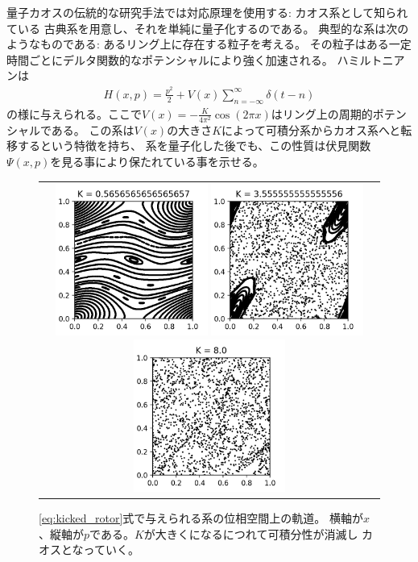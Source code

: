 量子カオスの伝統的な研究手法では対応原理を使用する: カオス系として知られている
古典系を用意し、それを単純に量子化するのである。
典型的な系は次のようなものである\cite{ullmo}: あるリング上に存在する粒子を考える。
その粒子はある一定時間ごとにデルタ関数的なポテンシャルにより強く加速される。
ハミルトニアンは
\begin{align}
	H(x, p) = \frac{p^2}{2} + V(x)\sum_{n=-\infty}^{\infty}\delta(t-n)
	\label{eq:kicked_rotor}
\end{align}
の様に与えられる。ここで$V(x) = -\frac{K}{4\pi^2}\cos(2\pi x)$はリング上の周期的ポテンシャルである。
この系は$V(x)$の大きさ$K$によって可積分系からカオス系へと転移するという特徴を持ち、
系を量子化した後でも、この性質は伏見関数$\Psi(x, p)$を見る事により保たれている事を示せる。
\begin{figure}[ht]
	\centering
	\begin{tabular}{c}
		\begin{minipage}{0.33\hsize}
			\centering
			\includegraphics[width=5cm]{figures/figure7}
		\end{minipage}
		\begin{minipage}{0.33\hsize}
			\centering
			\includegraphics[width=5cm]{figures/figure44}
		\end{minipage}
		\begin{minipage}{0.33\hsize}
			\centering
			\includegraphics[width=5cm]{figures/figure99}
		\end{minipage}
	\end{tabular}
	\caption{\eqref{eq:kicked_rotor}式で与えられる系の位相空間上の軌道。
		横軸が$x$、縦軸が$p$である。$K$が大きくになるにつれて可積分性が消滅し
		カオスとなっていく。}
	\label{fig:phase_space_of_kicked_rotor}
\end{figure}

\pagebreak